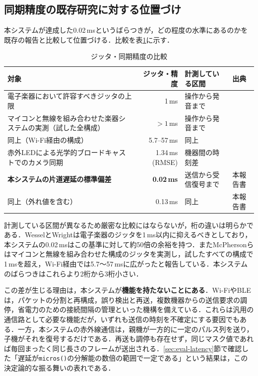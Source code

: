 \documentclass[uplatex,dvipdfmx]{jlreq}
\begin{document}
\subsection{同期精度の既存研究に対する位置づけ}
\label{sec:disc-position}

本システムが達成した0.02\,msというばらつきが，どの程度の水準にあるのかを既存の報告と比較して位置づける．比較を表\ref{tab:jitter-compare}に示す．

\begin{table}[tb]
\caption{ジッタ・同期精度の比較}
\label{tab:jitter-compare}
\begin{center}
\footnotesize
\begin{tabular}{p{15em}rp{7em}l}
\hline
対象 & ジッタ・精度 & 計測している区間 & 出典 \\
\hline
電子楽器において許容すべきジッタの上限 & 1\,ms & 操作から発音まで & \cite{wessel2002} \\
マイコンと無線を組み合わせた楽器システムの実測（試した全構成） & $>1$\,ms & 操作から発音まで & \cite{mcpherson2016} \\
同上（Wi-Fi経由の構成） & 5.7--57\,ms & 同上 & \cite{mcpherson2016} \\
赤外LEDによる光学的ブロードキャストでのカメラ同期 & 1.34\,ms (RMSE) & 機器間の時刻差 & \cite{meyer2026} \\
\textbf{本システムの片道遅延の標準偏差} & \textbf{0.02\,ms} & 送信から受信復号まで & 本報告書 \\
同上（外れ値を含む） & 0.13\,ms & 同上 & 本報告書 \\
\hline
\end{tabular}
\end{center}
\end{table}

計測している区間が異なるため厳密な比較にはならないが，桁の違いは明らかである．WesselとWrightは電子楽器のジッタを1\,ms以内に抑えるべきとしており\cite{wessel2002}，本システムの0.02\,msはこの基準に対して約50倍の余裕を持つ．またMcPhersonらはマイコンと無線を組み合わせた構成のジッタを実測し，試したすべての構成で1\,msを超え，Wi-Fi経由では5.7〜57\,msに広がったと報告している\cite{mcpherson2016}．本システムのばらつきはこれらより2桁から3桁小さい．

この差が生じる理由は，本システムが\textbf{機能を持たないことにある}．Wi-FiやBLEは，パケットの分割と再構成，誤り検出と再送，複数機器からの送信要求の調停，省電力のための接続間隔の管理といった機構を備えている．これらは汎用の通信路として必要な機能だが，いずれも送信の時刻を不確定にする要因でもある．一方，本システムの赤外線通信は，親機が一方的に一定のパルス列を送り，子機がそれを復号するだけである．再送も調停も存在せず，同じマスク値であれば毎回まったく同じ長さのフレームが送出される．\ref{sec:eval-latency}節で確認した「遅延が\texttt{micros()}の分解能の数倍の範囲で一定である」という結果は，この決定論的な振る舞いの表れである．
\end{document}
